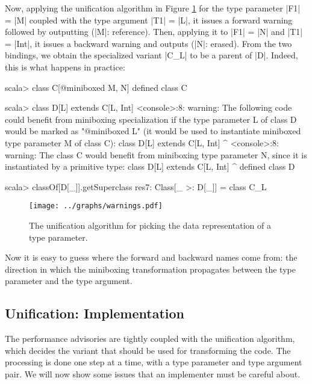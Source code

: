Now, applying the unification algorithm in Figure \ref{fig:algorithm} for the type parameter |F1| = |M| coupled with the type argument |T1| = |L|, it issues a forward warning followed by outputting (|M|: reference). Then, applying it to |F1| = |N| and |T1| = |Int|, it issues a backward warning and outputs (|N|: erased). From the two bindings, we obtain the specialized variant |C_L| to be a parent of |D|. Indeed, this is what happens in practice:

\begin{lstlisting-nobreak-nolang}
scala> class C[@miniboxed M, N]
defined class C

scala> class D[L] extends C[L, Int]
<console>:8: warning: The following code could benefit from miniboxing specialization if the type parameter L of class D would be marked as "@miniboxed L" (it would be used to instantiate miniboxed type parameter M of class C):
       class D[L] extends C[L, Int]
               ^
<console>:8: warning: The class C would benefit from miniboxing type parameter N, since it is instantiated by a primitive type:
       class D[L] extends C[L, Int]
               ^
defined class D

scala> classOf[D[_]].getSuperclass
res7: Class[_ >: D[_]] = class C_L
\end{lstlisting-nobreak-nolang}

\begin{figure}[t!]
  \vspace{0.01\textheight}
  \centering
  \texttt{[image: ../graphs/warnings.pdf]}
  \caption{The unification algorithm for picking the data representation of a type parameter.}
  \label{fig:algorithm}
\end{figure}

Now it is easy to guess where the forward and backward names come from: the direction in which the miniboxing transformation propagates between the type parameter and the type argument.

\vspace{-0.25em}

\subsection{Unification: Implementation}

\vspace{-0.5em}

The performance advisories are tightly coupled with the unification algorithm, which decides the variant that should be used for transforming the code. The processing is done one step at a time, with a type parameter and type argument pair. We will now show some issues that an implementer must be careful about.

